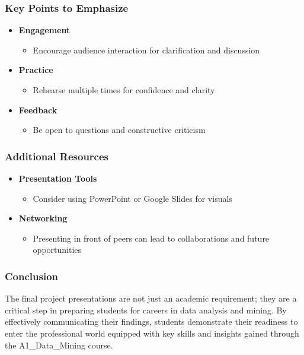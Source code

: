 \documentclass[aspectratio=169]{beamer}
\begin{document}
\begin{frame}[fragile]
  \frametitle{Key Points to Emphasize}
  \begin{itemize}
    \item \textbf{Engagement}
      \begin{itemize}
        \item Encourage audience interaction for clarification and discussion
      \end{itemize}
    \item \textbf{Practice}
      \begin{itemize}
        \item Rehearse multiple times for confidence and clarity
      \end{itemize}
    \item \textbf{Feedback}
      \begin{itemize}
        \item Be open to questions and constructive criticism
      \end{itemize}
  \end{itemize}
\end{frame}

\begin{frame}[fragile]
  \frametitle{Additional Resources}
  \begin{itemize}
    \item \textbf{Presentation Tools}
      \begin{itemize}
        \item Consider using PowerPoint or Google Slides for visuals
      \end{itemize}
    \item \textbf{Networking}
      \begin{itemize}
        \item Presenting in front of peers can lead to collaborations and future opportunities
      \end{itemize}
  \end{itemize}
\end{frame}

\begin{frame}[fragile]
  \frametitle{Conclusion}
  The final project presentations are not just an academic requirement; they are a critical step in preparing students for careers in data analysis and mining. By effectively communicating their findings, students demonstrate their readiness to enter the professional world equipped with key skills and insights gained through the A1\_Data\_Mining course.
\end{frame}
\end{document}
